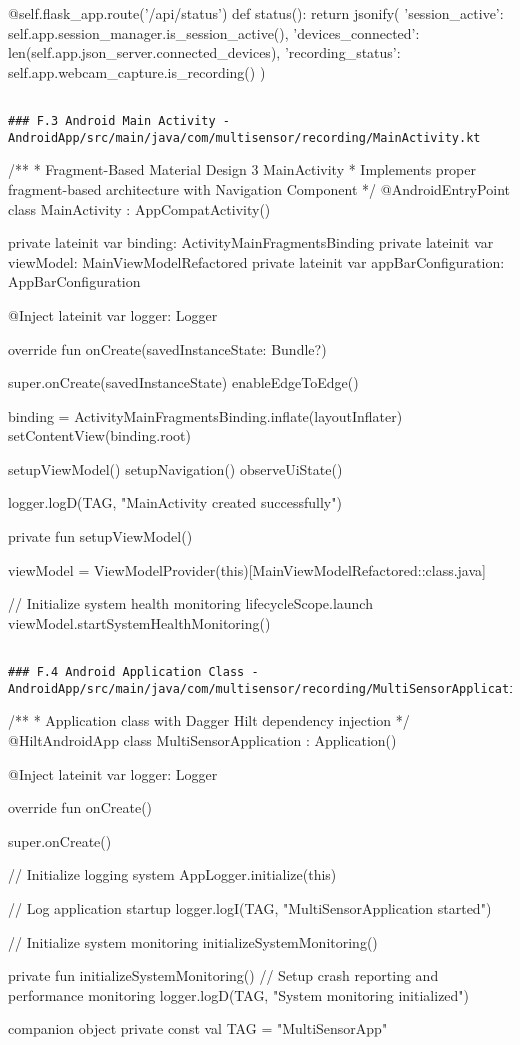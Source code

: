 \documentclass[12pt,a4paper]{report}
\begin{document}
        @self.flask\_app.route('/api/status')
        def status():
            return jsonify({
                'session\_active': self.app.session\_manager.is\_session\_active(),
                'devices\_connected': len(self.app.json\_server.connected\_devices),
                'recording\_status': self.app.webcam\_capture.is\_recording()
            })
\begin{verbatim}

### F.3 Android Main Activity - AndroidApp/src/main/java/com/multisensor/recording/MainActivity.kt

\end{verbatim}
/**
 * Fragment-Based Material Design 3 MainActivity
 * Implements proper fragment-based architecture with Navigation Component
 */
@AndroidEntryPoint
class MainActivity : AppCompatActivity() {

    private lateinit var binding: ActivityMainFragmentsBinding
    private lateinit var viewModel: MainViewModelRefactored
    private lateinit var appBarConfiguration: AppBarConfiguration

    @Inject
    lateinit var logger: Logger

    override fun onCreate(savedInstanceState: Bundle?) {
        super.onCreate(savedInstanceState)
        enableEdgeToEdge()

        binding = ActivityMainFragmentsBinding.inflate(layoutInflater)
        setContentView(binding.root)

        setupViewModel()
        setupNavigation()
        observeUiState()

        logger.logD(TAG, "MainActivity created successfully")
    }

    private fun setupViewModel() {
        viewModel = ViewModelProvider(this)[MainViewModelRefactored::class.java]

        // Initialize system health monitoring
        lifecycleScope.launch {
            viewModel.startSystemHealthMonitoring()
        }
    }
}
\begin{verbatim}

### F.4 Android Application Class - AndroidApp/src/main/java/com/multisensor/recording/MultiSensorApplication.kt

\end{verbatim}
/**
 * Application class with Dagger Hilt dependency injection
 */
@HiltAndroidApp
class MultiSensorApplication : Application() {

    @Inject
    lateinit var logger: Logger

    override fun onCreate() {
        super.onCreate()

        // Initialize logging system
        AppLogger.initialize(this)

        // Log application startup
        logger.logI(TAG, "MultiSensorApplication started")

        // Initialize system monitoring
        initializeSystemMonitoring()
    }

    private fun initializeSystemMonitoring() {
        // Setup crash reporting and performance monitoring
        logger.logD(TAG, "System monitoring initialized")
    }

    companion object {
        private const val TAG = "MultiSensorApp"
    }
}
\end{document}
